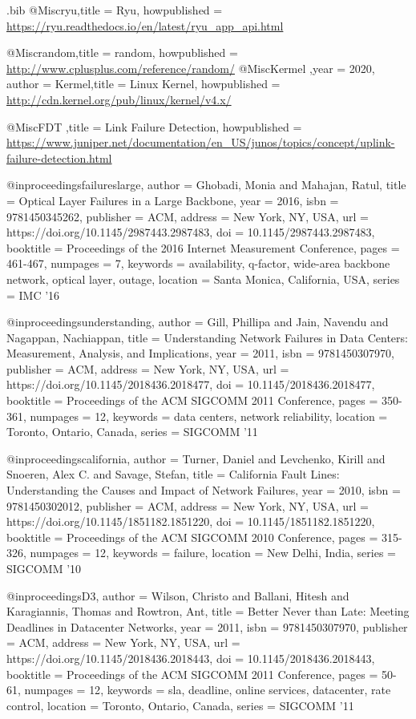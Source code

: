 \documentclass[sigconf]{acmart}
\begin{document}
\begin{filecontents}{\jobname.bib}
@Misc{ryu,title = {Ryu}, howpublished = {\url{https://ryu.readthedocs.io/en/latest/ryu_app_api.html}}}

@Misc{random,title = {random}, howpublished = {\url{http://www.cplusplus.com/reference/random/}}}
@Misc{Kermel ,year = 2020, author = {{Kermel}},title = {Linux Kernel}, howpublished = {\url{http://cdn.kernel.org/pub/linux/kernel/v4.x/}}}

@Misc{FDT ,title = {Link Failure Detection}, howpublished = {\url{https://www.juniper.net/documentation/en_US/junos/topics/concept/uplink-failure-detection.html
}}}

@inproceedings{failureslarge, author = {Ghobadi, Monia and Mahajan, Ratul}, title = {Optical Layer Failures in a Large Backbone}, year = {2016}, isbn = {9781450345262}, publisher = {ACM}, address = {New York, NY, USA}, url = {https://doi.org/10.1145/2987443.2987483}, doi = {10.1145/2987443.2987483}, booktitle = {Proceedings of the 2016 Internet Measurement Conference}, pages = {461-467}, numpages = {7}, keywords = {availability, q-factor, wide-area backbone network, optical layer, outage}, location = {Santa Monica, California, USA}, series = {IMC '16} }

@inproceedings{understanding, author = {Gill, Phillipa and Jain, Navendu and Nagappan, Nachiappan}, title = {Understanding Network Failures in Data Centers: Measurement, Analysis, and Implications}, year = {2011}, isbn = {9781450307970}, publisher = {ACM}, address = {New York, NY, USA}, url = {https://doi.org/10.1145/2018436.2018477}, doi = {10.1145/2018436.2018477}, booktitle = {Proceedings of the ACM SIGCOMM 2011 Conference}, pages = {350-361}, numpages = {12}, keywords = {data centers, network reliability}, location = {Toronto, Ontario, Canada}, series = {SIGCOMM '11} }

@inproceedings{california, author = {Turner, Daniel and Levchenko, Kirill and Snoeren, Alex C. and Savage, Stefan}, title = {California Fault Lines: Understanding the Causes and Impact of Network Failures}, year = {2010}, isbn = {9781450302012}, publisher = {ACM}, address = {New York, NY, USA}, url = {https://doi.org/10.1145/1851182.1851220}, doi = {10.1145/1851182.1851220}, booktitle = {Proceedings of the ACM SIGCOMM 2010 Conference}, pages = {315-326}, numpages = {12}, keywords = {failure}, location = {New Delhi, India}, series = {SIGCOMM '10} }

@inproceedings{D3, author = {Wilson, Christo and Ballani, Hitesh and Karagiannis, Thomas and Rowtron, Ant}, title = {Better Never than Late: Meeting Deadlines in Datacenter Networks}, year = {2011}, isbn = {9781450307970}, publisher = {ACM}, address = {New York, NY, USA}, url = {https://doi.org/10.1145/2018436.2018443}, doi = {10.1145/2018436.2018443}, booktitle = {Proceedings of the ACM SIGCOMM 2011 Conference}, pages = {50-61}, numpages = {12}, keywords = {sla, deadline, online services, datacenter, rate control}, location = {Toronto, Ontario, Canada}, series = {SIGCOMM '11} }


\end{filecontents}
\end{document}
